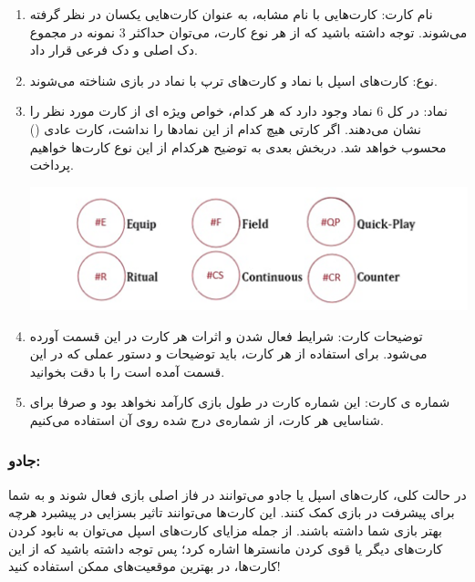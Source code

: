 \documentclass[]{article}
\begin{document}
\begin{enumerate}
	
	\item
	نام کارت: کارت‌هایی با نام مشابه، به عنوان کارت‌هایی یکسان  در نظر گرفته می‌شوند. توجه داشته باشید که از هر نوع کارت، می‌توان حداکثر 3 نمونه در مجموع دک اصلی و دک فرعی قرار داد.
	
	\item
	نوع: کارت‌های اسپل با نماد    و کارت‌های ترپ با نماد   در بازی شناخته می‌شوند.
	
	
	\item
	نماد: در کل 6 نماد وجود دارد که هر کدام، خواص ویژه ای از کارت مورد نظر را نشان می‌دهند. اگر کارتی هیچ کدام از این نمادها را نداشت، کارت عادی () محسوب خواهد شد. دربخش بعدی به توضیح هرکدام از این نوع کارت‌ها خواهیم پرداخت.
	
	\begin{center}
		\includegraphics[width =1.0 \textwidth]{Resources/spelltrap.png}
		
	\end{center}
	
	
	
	\item
	 توضیحات کارت: شرایط فعال شدن و اثرات هر کارت در این قسمت آورده می‌شود. برای استفاده از هر کارت، باید توضیحات و دستور عملی که در این قسمت آمده است را با دقت بخوانید.
	
	\item
شماره ی کارت: این شماره کارت در طول بازی کارآمد نخواهد بود  و صرفا برای شناسایی هر کارت، از شماره‌ی درج شده روی آن استفاده می‌کنیم.
	
	
	
\end{enumerate}


\subsubsection*{{\titr جادو:}}

در حالت کلی، کارت‌های اسپل یا جادو می‌توانند در فاز اصلی بازی فعال شوند و به شما برای پیشرفت در بازی کمک کنند. این کارت‌ها می‌توانند تاثیر بسزایی در پیشبرد هرچه بهتر بازی شما داشته باشند. از جمله مزایای کارت‌های اسپل می‌توان به نابود کردن کارت‌های دیگر یا قوی کردن مانستر‌ها اشاره کرد؛ پس توجه داشته باشید که از این کارت‌ها، در بهترین موقعیت‌های ممکن استفاده کنید!
\end{document}
